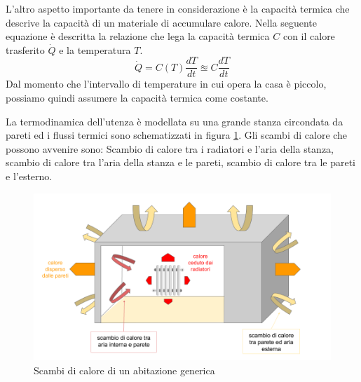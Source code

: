 \documentclass[laurea,oneside,11pt]{USiena_tesiLM}
\begin{document}
L'altro aspetto importante da tenere in considerazione è la capacità termica che descrive la capacità di un materiale di accumulare calore. Nella seguente equazione è descritta la relazione che lega la capacità termica $C$ con il calore trasferito $\dot{Q}$ e la temperatura $T$.
\begin{equation}
\dot{Q} = C(T) \frac{dT}{dt} \approxeq C \frac{dT}{dt}
\label{eq:q2}
\end{equation}
Dal momento che l'intervallo di temperature in cui opera la casa è piccolo, possiamo quindi assumere la capacità termica come costante.

La termodinamica dell'utenza è modellata su una grande stanza circondata da pareti ed i flussi termici sono schematizzati in figura \ref{fig:scambio}. Gli scambi di calore che possono avvenire sono: Scambio di calore tra i radiatori e l'aria della stanza, scambio di calore tra l'aria della stanza e le pareti, scambio di calore tra le pareti e l'esterno.

\begin{figure}[h]
\begin{center}
\includegraphics[width=1.05\textwidth]{figure/scambio_casa}
\caption{Scambi di calore di un abitazione generica}
\label{fig:scambio}
\end{center}
\end{figure}
\end{document}
